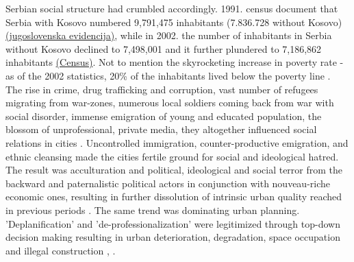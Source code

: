 \documentclass[11pt]{report}
\begin{document}
Serbian social structure had crumbled accordingly. 1991. census document that Serbia with Kosovo numbered 9,791,475 inhabitants (7.836.728 without Kosovo) \href{ref}{(jugoslovenska evidencija)}, while in 2002. the number of inhabitants in Serbia without Kosovo declined to 7,498,001 and it further plundered to 7,186,862 inhabitants \href{ref}{(Census)}.
Not to mention the skyrocketing increase in poverty rate - as of the 2002 statistics, 20\% of the inhabitants lived below the poverty line \cite{Vladina strategija za smanjenje siromastva}.
\\

The rise in crime, drug trafficking and corruption, vast number of refugees migrating from war-zones, numerous local soldiers coming back from war with social disorder, immense emigration of young and educated population, the blossom of unprofessional, private media, they altogether influenced social relations in cities \href{ref}{\citealt{doytchinov_urban_2015}}.
Uncontrolled immigration, counter-productive emigration,  and ethnic cleansing made the cities fertile ground for social and ideological hatred.
The result was acculturation and political, ideological and social terror from the backward and paternalistic political actors in conjunction with nouveau-riche economic ones, resulting in further dissolution of intrinsic urban quality reached in previous periods \href{ref}{\citealt{doytchinov_belgrade_2015}}.
The same trend was dominating urban planning. 'Deplanification' and 'de-professionalization' were legitimized through top-down decision making resulting in urban deterioration, degradation, space occupation and illegal construction \href{ref}{\citealt{vujovic_belgrades_2007}}, \href{ref}{\citealt{vukmirovic_city_2013}}.
\\
\end{document}
